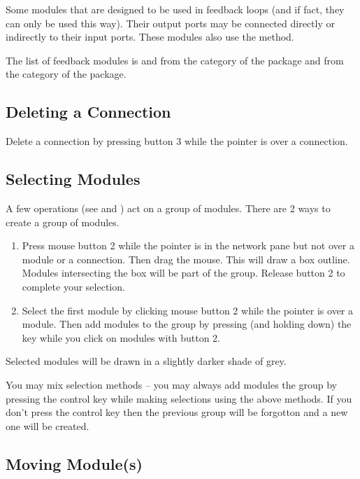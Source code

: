 Some modules that are designed to be used in feedback loops (and if fact,
they can only be used this way).  Their output ports may be connected
directly or indirectly to their input ports.  These modules also use the
 method.

The list of feedback modules is  and
 from the  category of the
 package and  from the
 category of the  package.

\subsection{Deleting a Connection}
\label{sec:deleteconnections}

Delete a connection by pressing button 3 while the pointer is
over a connection.

\subsection{Selecting Modules}
\label{sec:selectmods}

A few operations (see  and
) act on a group of
modules.  There are 2 ways to create a group of modules.

\begin{enumerate}
\item Press mouse button 2 while the pointer is in the network pane but not over
a module or a connection.  Then drag the mouse.  This will draw a box
outline.  Modules intersecting the box will be part of the group.  Release
button 2 to complete your selection.
\item Select the first module by clicking mouse button 2 while the pointer is
over a module.  Then add modules to the group by pressing (and holding
down) the  key while you click on modules with button 2.
\end{enumerate}

Selected modules will be drawn in a slightly darker shade of grey.

You may mix selection methods -- you may always add modules the group by
pressing the control key while making selections using the above methods.
If you don't press the control key then the previous group will be
forgotton and a new one will be created.

\subsection{Moving Module(s)}
\label{sec:movemod}

